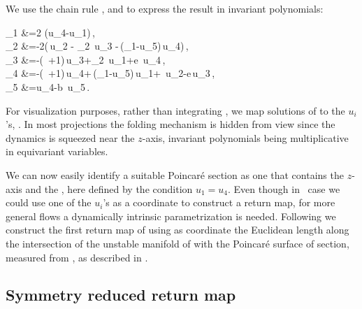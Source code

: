 We use the chain rule ,  and 
to express the result in invariant polynomials:
    \
\beq
\begin{split}
  _1 &=2\,\sigma\,(u_4-u_1)\,,\\
  _2 &=-2\left(\,u_2 - \rho_2\, u_3 -\,(\rho_1-u_5)\,u_4\right)\,,\\
  _3 &=-(\sigma\, +1)\,u_3+\rho_2\, u_1+e\, u_4\,,\\
  _4 &=-(\sigma\, +1)\,u_4+\,(\rho_1-u_5)\,u_1+\sigma\, u_2-e\,u_3\,,\\
  \dot{u}_5 &=u_4-b\, u_5\,.
\end{split}
\label{eq:CLEip}
\eeq
For visualization purposes, rather than integrating
, we map solutions of  to the
$u_i$'s, . In most projections the folding
mechanism is hidden from view since the dynamics is squeezed
near the $z$-axis, invariant polynomials being multiplicative
in equivariant variables.

We can now easily identify a suitable Poincar\'e
section as one that contains the $z$-axis and
the \reqv, here defined by the condition $u_1=u_4$.
Even though in \cLe\ case we could use one of the $u_i$'s as
a coordinate to construct a return map, for more general flows
a dynamically intrinsic parametrization is needed.
Following  we construct the first return map
of \reffig{fig:CLEipRM} using as coordinate the
Euclidean length along the intersection of the unstable
manifold of  with the Poincar\'e surface of section,
measured from \REQV{}{1}, as described in .


\subsection{\label{s:Poincare}Symmetry reduced return map}

